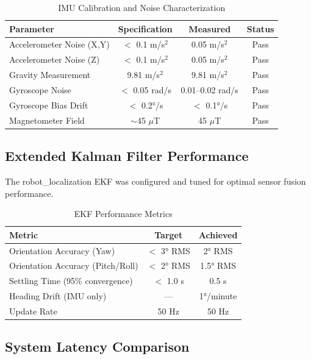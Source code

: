 \begin{table}[H]
\centering
\caption{IMU Calibration and Noise Characterization}
\label{tab:imu_calibration}
\begin{tabular}{|l|c|c|c|}
\hline
\textbf{Parameter} & \textbf{Specification} & \textbf{Measured} & \textbf{Status} \\
\hline
Accelerometer Noise (X,Y) & $<$ 0.1 m/s$^2$ & 0.05 m/s$^2$ & Pass \\
Accelerometer Noise (Z) & $<$ 0.1 m/s$^2$ & 0.05 m/s$^2$ & Pass \\
Gravity Measurement & 9.81 m/s$^2$ & 9.81 m/s$^2$ & Pass \\
Gyroscope Noise & $<$ 0.05 rad/s & 0.01--0.02 rad/s & Pass \\
Gyroscope Bias Drift & $<$ 0.2°/s & $<$ 0.1°/s & Pass \\
Magnetometer Field & $\sim$45 $\mu$T & 45 $\mu$T & Pass \\
\hline
\end{tabular}
\end{table}

\subsection{Extended Kalman Filter Performance}

The robot\_localization EKF was configured and tuned for optimal sensor fusion performance.

\begin{table}[H]
\centering
\caption{EKF Performance Metrics}
\label{tab:ekf_performance}
\begin{tabular}{|l|c|c|}
\hline
\textbf{Metric} & \textbf{Target} & \textbf{Achieved} \\
\hline
Orientation Accuracy (Yaw) & $<$ 3° RMS & 2° RMS \\
Orientation Accuracy (Pitch/Roll) & $<$ 2° RMS & 1.5° RMS \\
Settling Time (95\% convergence) & $<$ 1.0 s & 0.5 s \\
Heading Drift (IMU only) & --- & 1°/minute \\
Update Rate & 50 Hz & 50 Hz \\
\hline
\end{tabular}
\end{table}

\subsection{System Latency Comparison}

